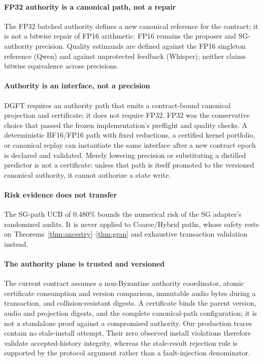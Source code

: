 
\paragraph{FP32 authority is a canonical path, not a repair}
The FP32 batched authority defines a new canonical reference for the
contract; it is not a bitwise repair of FP16 arithmetic. FP16 remains the
proposer and SG-authority precision. Quality estimands are defined against
the FP16 singleton reference (Qwen) and against unprotected feedback
(Whisper); neither claims bitwise equivalence across precisions.

\paragraph{Authority is an interface, not a precision}
DGFT requires an authority path that emits a contract-bound canonical
projection and certificate; it does not require FP32. FP32 was the conservative
choice that passed the frozen implementation's preflight and quality checks.
A deterministic BF16/FP16 path with fixed reductions, a certified kernel
portfolio, or canonical replay can instantiate the same interface after a
new contract epoch is declared and validated. Merely lowering precision or
substituting a distilled predictor is not a certificate: unless that path is
itself promoted to the versioned canonical authority, it cannot authorize a
state write.

\paragraph{Risk evidence does not transfer}
The SG-path UCB of 0.480\% bounds the numerical risk of the SG adapter's
randomized audits. It is never applied to Coarse/Hybrid paths, whose safety
rests on Theorems~\ref{thm:ancestry}--\ref{thm:gran} and exhaustive
transaction validation instead.

\paragraph{The authority plane is trusted and versioned}
The current contract assumes a non-Byzantine authority coordinator, atomic
certificate consumption and version comparison, immutable audio bytes during
a transaction, and collision-resistant digests. A certificate binds the
parent version, audio and projection digests, and the complete canonical-path
configuration; it is not a standalone proof against a compromised authority.
Our production traces contain no stale-install attempt. Their zero observed
install violations therefore validate accepted-history integrity, whereas
the stale-result rejection rule is supported by the protocol argument rather
than a fault-injection denominator.


